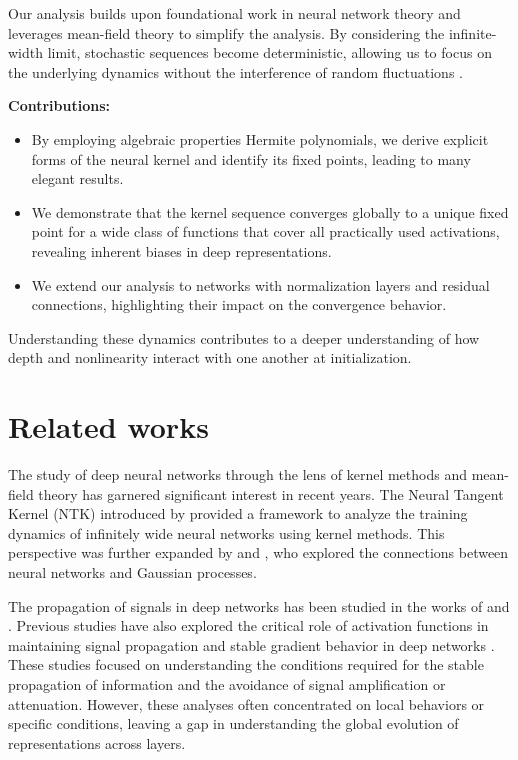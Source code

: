 \documentclass[twoside]{article}
\theoremstyle{definition}
\begin{document}
Our analysis builds upon foundational work in neural network theory and leverages mean-field theory to simplify the analysis. By considering the infinite-width limit, stochastic sequences become deterministic, allowing us to focus on the underlying dynamics without the interference of random fluctuations \citep{poole2016exponential, yang2019meanfield, mei2019mean}.

\textbf{Contributions:} 
\begin{itemize}
    \item By employing algebraic properties Hermite polynomials, we derive explicit forms of the neural kernel and identify its fixed points, leading to many elegant results.  
    \item We demonstrate that the kernel sequence converges globally to a unique fixed point for a wide class of functions that cover all practically used activations, revealing inherent biases in deep representations. 
    \item We extend our analysis to networks with normalization layers and residual connections, highlighting their impact on the convergence behavior.
\end{itemize}

Understanding these dynamics contributes to a deeper understanding of how depth and nonlinearity interact with one another at initialization. 


\section{Related works}
The study of deep neural networks through the lens of kernel methods and mean-field theory has garnered significant interest in recent years. The Neural Tangent Kernel (NTK) introduced by \citet{jacot2018neural} provided a framework to analyze the training dynamics of infinitely wide neural networks using kernel methods. This perspective was further expanded by \citet{lee2019wide} and \citet{arora2019exact}, who explored the connections between neural networks and Gaussian processes.

The propagation of signals in deep networks has been studied in the works of \citet{schoenholz2016deep} and \citet{pennington2017resurrecting}. Previous studies have also explored the critical role of activation functions in maintaining signal propagation and stable gradient behavior in deep networks \citep{hayou2019impact}. These studies focused on understanding the conditions required for the stable propagation of information and the avoidance of signal amplification or attenuation. However, these analyses often concentrated on local behaviors or specific conditions, leaving a gap in understanding the global evolution of representations across layers. 
\end{document}
